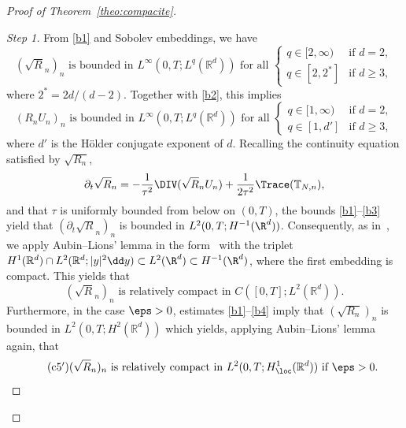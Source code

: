 \begin{proof}[Proof of Theorem~\ref{theo:compacite}]
\begin{proof}[Step 1]
From \eqref{b1} and Sobolev embeddings, we have
\begin{equation*}\label{b5}
\tag{b5} (\sqrt{R}_n)_{n} \text{ is bounded in } L^{\infty}(0,T;L^{q}(\mathbb R^d))
\text{ for all }
\begin{cases}
q \in [2,\infty) &\text{if } d = 2, \\
q \in [2,2^*] &\text{if } d \ge 3,
\end{cases}
\end{equation*}
where $2^* = 2d/(d-2)$. Together with \eqref{b2}, this implies
\begin{equation*}\label{b6}
\tag{b6} ({R}_n U_n)_{n} \text{ is bounded in } L^{\infty}(0,T;L^{q}(\mathbb R^d))
\text{ for all }
\begin{cases}
q \in [1,\infty) &\text{if } d = 2, \\
q \in [1,d'] &\text{if } d \ge 3,
\end{cases}
\end{equation*}
where $d'$ is the H\"older conjugate exponent of $d$. Recalling the continuity equation satisfied by $\sqrt{R_n}$,
\[
\partial_t\sqrt{R}_n = -\frac{1}{\tau^2}\DIV (\sqrt{R}_n U_n) +
\frac{1}{2\tau^2}\Trace(\mathbb T_{N,n}),
\]
and that $\tau$ is uniformly bounded from below on $(0,T)$, the bounds \eqref{b1}--\eqref{b3} yield that $(\partial_t \sqrt R_n)_n$ is bounded in $L^2(0,T ; H^{-1}(\R^d))$. Consequently, as in~\cite[Lem\-ma~4.1]{MelletVasseur}, we apply Aubin--Lions' lemma in the form~\cite[Corollary~4]{Simon87} with the triplet $H^1(\mathbb R^d)
\cap L^2 (\mathbb R^d ; |y|^2 \dd y) \subset L^{2}(\R^d) \subset H^{-1}(\R^d)$, where the first embedding is compact. This yields that
\begin{equation*}\label{c5}
\tag{c5}
\text{$(\sqrt{R}_n)_{n}$ is relatively compact in $C([0,T];L^{2}(\mathbb R^d)).$}
\end{equation*}
Furthermore, in the case $\eps >0$, estimates \eqref{b1}--\eqref{b4} imply that $(\sqrt{R_n})_n$ is bounded in $L^{2}(0,T;H^2(\mathbb R^d))$ which yields, applying Aubin--Lions' lemma again, that
\begin{equation*}\label{eq_strongconvergence_R_eps}
\tag{c5$'$}
\text{$(\sqrt{R}_n)_{n}$ is relatively compact in $L^2(0,T;H^{1}_{\loc}(\mathbb R^d))$ if $\eps >0$. }
\end{equation*}
\let\qed\relax
\end{proof}


\end{proof}
